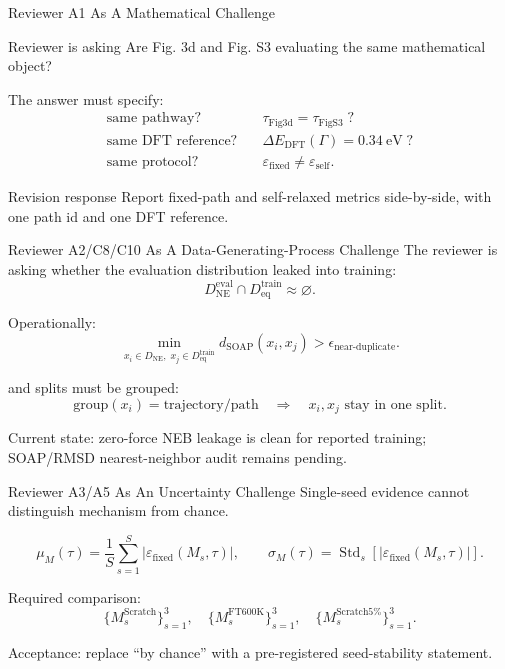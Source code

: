 \documentclass[aspectratio=169,10pt]{beamer}
\newcommand{\Deq}{D_{\mathrm{eq}}}
\newcommand{\Dne}{D_{\mathrm{NE}}}
\newcommand{\epsfixed}{\varepsilon_{\mathrm{fixed}}}
\newcommand{\epsself}{\varepsilon_{\mathrm{self}}}
\begin{document}
\begin{frame}{Reviewer A1 As A Mathematical Challenge}
  \begin{block}{Reviewer is asking}
  Are Fig. 3d and Fig. S3 evaluating the same mathematical object?
  \end{block}

  \vspace{0.2cm}
  The answer must specify:
  \begin{align*}
  \text{same pathway?} &\quad \tau_{\mathrm{Fig3d}} = \tau_{\mathrm{FigS3}} \; ?\\
  \text{same DFT reference?} &\quad \Delta E_{\mathrm{DFT}}(\Gamma) = 0.34\ \mathrm{eV}\; ?\\
  \text{same protocol?} &\quad \epsfixed \neq \epsself.
  \end{align*}

  \vspace{0.2cm}
  \begin{block}{Revision response}
  Report fixed-path and self-relaxed metrics side-by-side, with one path id and one DFT reference.
  \end{block}
\end{frame}

\begin{frame}{Reviewer A2/C8/C10 As A Data-Generating-Process Challenge}
  The reviewer is asking whether the evaluation distribution leaked into training:
  \[
  \Dne^{\mathrm{eval}} \cap \Deq^{\mathrm{train}} \approx \varnothing.
  \]

  \vspace{0.2cm}
  Operationally:
  \[
  \min_{x_i\in\Dne,\;x_j\in \Deq^{\mathrm{train}}}
  d_{\mathrm{SOAP}}(x_i,x_j)
  >
  \epsilon_{\mathrm{near\mbox{-}duplicate}}.
  \]

  \vspace{0.2cm}
  and splits must be grouped:
  \[
  \mathrm{group}(x_i)=\mathrm{trajectory/path}
  \quad\Rightarrow\quad
  x_i,x_j \text{ stay in one split.}
  \]

  \vspace{0.15cm}
  Current state: zero-force NEB leakage is clean for reported training; SOAP/RMSD nearest-neighbor audit remains pending.
\end{frame}

\begin{frame}{Reviewer A3/A5 As An Uncertainty Challenge}
  Single-seed evidence cannot distinguish mechanism from chance.

  \[
  \mu_M(\tau)
  =
  \frac{1}{S}\sum_{s=1}^{S}
  |\epsfixed(M_s,\tau)|,
  \qquad
  \sigma_M(\tau)
  =
  \operatorname{Std}_{s}
  \left[
  |\epsfixed(M_s,\tau)|
  \right].
  \]

  \vspace{0.25cm}
  Required comparison:
  \[
  \{M_s^{\mathrm{Scratch}}\}_{s=1}^3,
  \quad
  \{M_s^{\mathrm{FT600K}}\}_{s=1}^3,
  \quad
  \{M_s^{\mathrm{Scratch5\%}}\}_{s=1}^3.
  \]

  \vspace{0.15cm}
  Acceptance: replace ``by chance'' with a pre-registered seed-stability statement.
\end{frame}
\end{document}
